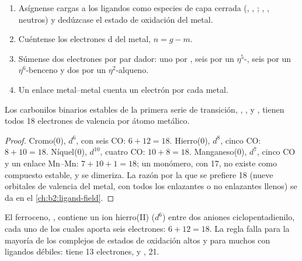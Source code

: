 \begin{method}\label{met:b2:coordination-complexes:electron-count}
\begin{enumerate}
  \item Asígnense cargas a los ligandos como especies de capa cerrada (, ,
        ; , ,  neutros) y dedúzcase el estado de
        oxidación del metal.
  \item Cuéntense los electrones d del metal, $n = g - m$.
  \item Súmense dos electrones por par dador: uno por , seis por un
        $\eta^5$-, seis por un $\eta^6$-benceno y dos por un $\eta^2$-alqueno.
  \item Un enlace metal--metal cuenta un electrón por cada metal.
\end{enumerate}
\end{method}

\begin{proposition}\label{prop:b2:coordination-complexes:eighteen}
Los carbonilos binarios estables de la primera serie de transición, ,
,  y , tienen todos 18 electrones de valencia por átomo
metálico.
\end{proposition}

\begin{proof}
Cromo(0), $d^6$, con seis CO: $6 + 12 = 18$. Hierro(0), $d^8$, cinco CO: $8 + 10 = 18$.
Níquel(0), $d^{10}$, cuatro CO: $10 + 8 = 18$. Manganeso(0), $d^7$, cinco CO y un enlace
Mn--Mn: $7 + 10 + 1 = 18$; un  monómero, con 17, no existe como
compuesto estable, y se dimeriza. La razón por la que se prefiere 18 (nueve orbitales de valencia
del metal, con todos los enlazantes o no enlazantes llenos) se da en el
\cref{ch:b2:ligand-field}.
\end{proof}

El ferroceno, , contiene un ion hierro(II) ($d^6$) entre dos
aniones ciclopentadienilo, cada uno de los cuales aporta seis electrones: $6 + 12 = 18$. La regla falla para
la mayoría de los complejos de estados de oxidación altos y para muchos con ligandos débiles: 
tiene 13 electrones, y , 21.

